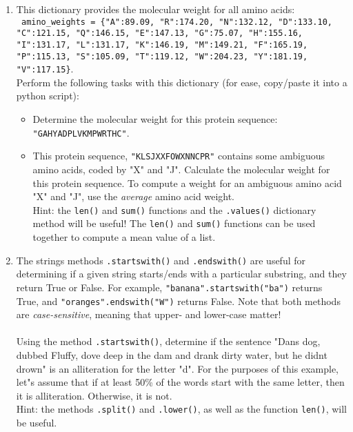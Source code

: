 \documentclass{article}[12pt]
\newcommand{\code}[1]{\texttt{#1}}  %
\begin{document}
\begin{enumerate}
	\item This dictionary provides the molecular weight for all amino acids: \\ \code{ amino\_weights = \{"A":89.09, "R":174.20, "N":132.12, "D":133.10, "C":121.15, "Q":146.15, "E":147.13, "G":75.07, "H":155.16, "I":131.17, "L":131.17, "K":146.19, "M":149.21, "F":165.19, "P":115.13, "S":105.09, "T":119.12, "W":204.23, "Y":181.19, "V":117.15\}}. \\ Perform the following tasks with this dictionary (for ease, copy/paste it into a python script):
	\begin{itemize}
		\item Determine the molecular weight for this protein sequence: \\ \code{"GAHYADPLVKMPWRTHC"}.
		\item This protein sequence, \code{"KLSJXXFOWXNNCPR"} contains some ambiguous amino acids, coded by "X" and "J". Calculate the molecular weight for this protein sequence. To compute a weight for an ambiguous amino acid "X" and "J", use the \emph{average} amino acid weight. \\ Hint: the \code{len()} and \code{sum()} functions and the \code{.values()} dictionary method will be useful! The \code{len()} and \code{sum()} functions can be used together to compute a mean value of a list.
		
	\end{itemize}
	
	
	\item The strings methods \code{.startswith()} and \code{.endswith()} are useful for determining if a given string starts/ends with a particular substring, and they return True or False. For example, \code{"banana".startswith("ba")} returns True, and \code{"oranges".endswith("W")} returns False. Note that both methods are \emph{case-sensitive}, meaning that upper- and lower-case matter! \\\\ Using the method \code{.startswith()}, determine if the sentence "Dan\textquotesingle s dog, dubbed Fluffy, dove deep in the dam and drank dirty water, but he didn\textquotesingle t drown" is an alliteration for the letter "d". For the purposes of this example, let"s assume that if at least 50\% of the words start with the same letter, then it is alliteration. Otherwise, it is not. 
	\\ Hint: the methods \code{.split()} and \code{.lower()}, as well as the function \code{len()}, will be useful.


\end{enumerate}
\end{document}
